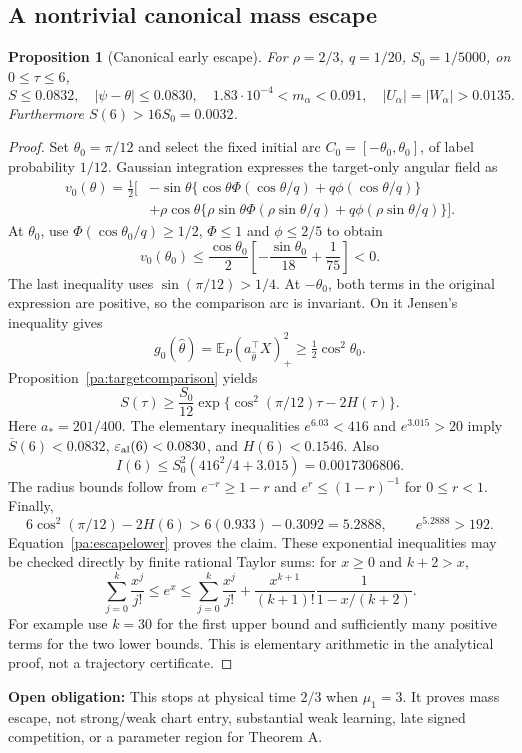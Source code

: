 \documentclass[11pt]{article}
\numberwithin{equation}{section}
\newtheorem{proposition}{Proposition}[section]
\theoremstyle{definition}
\theoremstyle{remark}
\newcommand{\E}{\mathbb E}
\newcommand{\1}{\mathbf 1}
\newcommand{\openobligation}[1]{\par\noindent\textbf{Open obligation:} #1\par\smallskip}
\begin{document}
\subsection{A nontrivial canonical mass escape}
\begin{proposition}[Canonical early escape]\label{pa:canonicalescape}
For $\rho=2/3$, $q=1/20$, $S_0=1/5000$, on $0\le\tau\le6$,
\[
 S\le0.0832,\quad |\psi-\theta|\le0.0830,\quad
 1.83\cdot10^{-4}<m_\alpha<0.091,
 \quad |U_\alpha|=|W_\alpha|>0.0135.
\]
Furthermore $S(6)>16S_0=0.0032$.
\end{proposition}
\begin{proof}
Set $\theta_0=\pi/12$ and select the fixed initial arc
$C_0=[-\theta_0,\theta_0]$, of label probability $1/12$. Gaussian integration
expresses the target-only angular field as
\begin{align*}
 v_0(\theta)=\tfrac12\big[&-\sin\theta\{\cos\theta\Phi(\cos\theta/q)
 +q\phi(\cos\theta/q)\}\\
 &+\rho\cos\theta\{\rho\sin\theta\Phi(\rho\sin\theta/q)
 +q\phi(\rho\sin\theta/q)\}\big].
\end{align*}
At $\theta_0$, use $\Phi(\cos\theta_0/q)\ge1/2$, $\Phi\le1$ and
$\phi\le2/5$ to obtain
\[
 v_0(\theta_0)\le\frac{\cos\theta_0}{2}
 \left[-\frac{\sin\theta_0}{18}+\frac1{75}\right]<0.
\]
The last inequality uses $\sin(\pi/12)>1/4$. At $-\theta_0$, both terms in
the original expression are positive, so the comparison arc is invariant.
On it Jensen's inequality gives
\[
 g_0(\widehat\theta)=\E_P(a_{\widehat\theta}^\top X)_+^2
 \ge\tfrac12\cos^2\theta_0.
\]
Proposition~\ref{pa:targetcomparison} yields
\begin{equation}\label{pa:escapelower}
 S(\tau)\ge\frac{S_0}{12}
 \exp\{\cos^2(\pi/12)\tau-2H(\tau)\}.
\end{equation}
Here $a_*=201/400$. The elementary inequalities
$e^{6.03}<416$ and $e^{3.015}>20$ imply
$\overline S(6)<0.0832$, $\varepsilon_{\rm al}(6)<0.0830$, and
$H(6)<0.1546$. Also
\[
 I(6)\le S_0^2(416^2/4+3.015)=0.0017306806.
\]
The radius bounds follow from $e^{-r}\ge1-r$ and
$e^r\le(1-r)^{-1}$ for $0\le r<1$. Finally,
\[
 6\cos^2(\pi/12)-2H(6)>6(0.933)-0.3092=5.2888,
 \qquad e^{5.2888}>192.
\]
Equation~\eqref{pa:escapelower} proves the claim. These exponential
inequalities may be checked directly by finite rational Taylor sums: for
$x\ge0$ and $k+2>x$,
\[
 \sum_{j=0}^k\frac{x^j}{j!}
 \le e^x\le
 \sum_{j=0}^k\frac{x^j}{j!}
 +\frac{x^{k+1}}{(k+1)!}\frac1{1-x/(k+2)}.
\]
For example use $k=30$ for the first upper bound and sufficiently many
positive terms for the two lower bounds. This is elementary arithmetic in
the analytical proof, not a trajectory certificate.
\end{proof}
\openobligation{This stops at physical time $2/3$ when $\mu_1=3$.
It proves mass escape, not strong/weak chart entry, substantial weak learning,
late signed competition, or a parameter region for Theorem A.}
\end{document}
